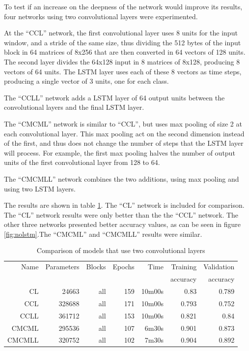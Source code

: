 To test if an increase on the deepness of the network would improve its results, four networks using two convolutional layers were experimented. 

At the ``CCL'' network, the first convolutional layer uses 8 units for the input window, and a stride of the same size, thus dividing the 512 bytes of the input block in 64 matrices of 8x256 that are then converted in 64 vectors of 128 units. The second layer divides the 64x128 input in 8 matrices of 8x128, producing 8 vectors of 64 units. The LSTM layer uses each of these 8 vectors as time steps, producing a single vector of 3 units, one for each class.

The ``CCLL'' network adds a LSTM layer of 64 output units between the convolutional layers and the final LSTM layer.

The ``CMCML'' network is similar to ``CCL'', but uses max pooling of size 2 at each convolutional layer. This max pooling act on the second dimension instead of the first, and thus does not change the number of steps that the LSTM layer will process. For example, the first max pooling halves the number of output units of the first convolutional layer from 128 to 64.

The ``CMCMLL'' network combines the two additions, using max pooling and using two LSTM layers.

The results are shown in table \ref{tab:carving2convs}. The ``CL'' network is included for comparison. The  ``CL'' network results were only better than the the ``CCL'' network. The other three networks presented better accuracy values, as can be seen in figure \ref{fig:nolstm}.The ``CMCML'' and ``CMCMLL'' results were similar.

\begin{table}[!ht]
    \centering
    \caption[Two convolutional layers]{Comparison of models that use two convolutional layers}
    \label{tab:carving2convs}
\begin{tabular}{r|r|r|r|r|r|r}
\hline
Name & Parameters & Blocks & Epochs & Time & Training          & Validation          \\       
     &            &        &        &         &          accuracy &            accuracy \\ \hline\hline

CL      & 24663     & all   & 159   & 10m00s    & 0.83  & 0.789 \\\hline
CCL     & 328688    & all   & 171   & 10m00s    & 0.793 & 0.752 \\\hline
CCLL    & 361712    & all   & 153   & 10m00s    & 0.821 & 0.84  \\\hline
CMCML   & 295536    & all   & 107   & 6m30s     & 0.901 & 0.873 \\\hline
CMCMLL  & 320752    & all   & 102   & 7m30s     & 0.904 & 0.892 \\\hline
\end{tabular}
\end{table}


